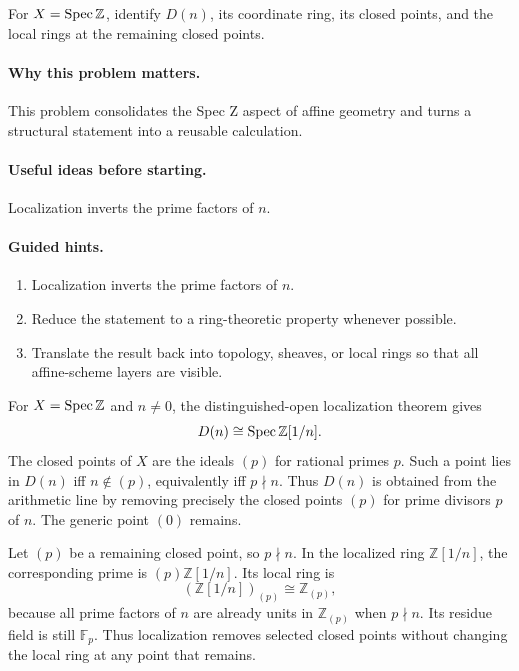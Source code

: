 \begin{problem}\label{prob:vi18-p13}
For $X=\operatorname{Spec}\mathbb Z$, identify $D(n)$, its coordinate ring, its closed points, and the local rings at the remaining closed points.
\end{problem}

\ifdefined\FullProblemDossiers
\paragraph{Why this problem matters.}
This problem consolidates the Spec Z aspect of affine geometry and turns a structural statement into a reusable calculation.

\paragraph{Useful ideas before starting.}
Localization inverts the prime factors of $n$.

\paragraph{Guided hints.}
\begin{enumerate}
\item Localization inverts the prime factors of $n$.
\item Reduce the statement to a ring-theoretic property whenever possible.
\item Translate the result back into topology, sheaves, or local rings so that all affine-scheme layers are visible.
\end{enumerate}

\begin{solution}
For $X=\operatorname{Spec}\mathbb Z$ and $n\neq0$, the distinguished-open localization theorem gives
\[
D(n)\cong\operatorname{Spec}\mathbb Z[1/n].
\]
The closed points of $X$ are the ideals $(p)$ for rational primes $p$. Such a point lies in $D(n)$ iff $n\notin(p)$, equivalently iff $p\nmid n$. Thus $D(n)$ is obtained from the arithmetic line by removing precisely the closed points $(p)$ for prime divisors $p$ of $n$. The generic point $(0)$ remains.

Let $(p)$ be a remaining closed point, so $p\nmid n$. In the localized ring $\mathbb Z[1/n]$, the corresponding prime is $(p)\mathbb Z[1/n]$. Its local ring is
\[
(\mathbb Z[1/n])_{(p)}\cong\mathbb Z_{(p)},
\]
because all prime factors of $n$ are already units in $\mathbb Z_{(p)}$ when $p\nmid n$. Its residue field is still $\mathbb F_p$. Thus localization removes selected closed points without changing the local ring at any point that remains.
\end{solution}


